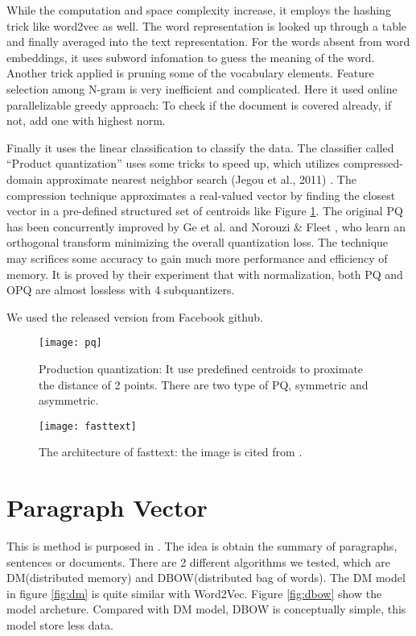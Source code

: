 While the computation and space complexity increase, it employs the hashing trick like word2vec as well. 
The word representation is looked up through a table and finally averaged into the text representation. 
For the words absent from word embeddings, it uses subword infomation\cite{bojanowski2016enriching} to guess the meaning of the word.
Another trick applied is pruning some of the vocabulary elements. Feature selection among N-gram is very inefficient and complicated.
Here it used online parallelizable greedy approach: To check if the document is covered already, if not, add one with highest norm.

Finally it uses the linear classification to classify the data. The classifier called \enquote{Product quantization} uses some tricks to speed up, which utilizes compressed-domain approximate nearest neighbor search (Jegou et al., 2011) \cite{jegou2011searching}.
The compression technique approximates a real-valued vector by finding the closest vector in a pre-defined structured set of centroids like Figure \ref{fig:pq}.
The original PQ has been concurrently improved by Ge et al. \cite{ge2013optimized} and Norouzi \& Fleet , who learn an orthogonal transform minimizing the overall quantization loss.
The technique may scrifices some accuracy to gain much more performance and efficiency of memory. It is proved by their experiment that with normalization, both PQ and OPQ are almost lossless with 4 subquantizers. 

We used the released version from Facebook github.

\begin{figure}[h]
    \centering
	\texttt{[image: pq]}
    \caption{Production quantization: It use predefined centroids to proximate the distance of 2 points. There are two type of PQ, symmetric and asymmetric. }
    \label{fig:pq}
\end{figure}

\begin{figure}[h]
    \centering
	\texttt{[image: fasttext]}
    \caption{The architecture of fasttext: the image is cited from \cite{joulin2016fasttext}.}
    \label{fig:fasttext}
\end{figure}


\section{Paragraph Vector}
	
This is method is purposed in \cite{PVDM}. The idea is obtain the summary of paragraphs, sentences or documents. 
There are 2 different algorithms we tested, which are DM(distributed memory) and DBOW(distributed bag of words). 
The DM model in figure \ref{fig:dm} is quite similar with Word2Vec.
Figure \ref{fig:dbow} show the model archeture. Compared with DM model, DBOW is conceptually simple, this model store less data. 

